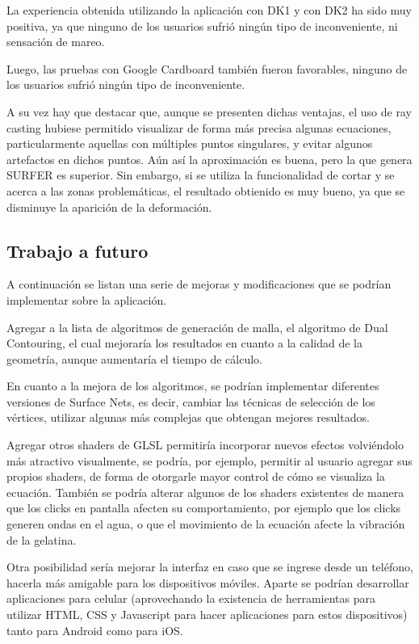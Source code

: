 \documentclass[12pt]{article}
\begin{document}
La experiencia obtenida utilizando la aplicación con DK1 y con DK2 ha sido muy positiva, ya que ninguno de los usuarios sufrió ningún tipo de inconveniente, ni sensación de mareo. 

Luego, las pruebas con Google Cardboard también fueron favorables, ninguno de los usuarios sufrió ningún tipo de inconveniente.

A su vez hay que destacar que, aunque se presenten dichas ventajas, el uso de ray casting hubiese permitido visualizar de forma más precisa algunas ecuaciones, particularmente aquellas con múltiples puntos singulares, y evitar algunos artefactos en dichos puntos. Aún así la aproximación es buena, pero la que genera SURFER es superior. Sin embargo, si se utiliza la funcionalidad de cortar y se acerca a las zonas problemáticas, el resultado obtienido es muy bueno, ya que se disminuye la aparición de la deformación.


\subsection{Trabajo a futuro}
A continuación se listan una serie de mejoras y modificaciones que se podrían implementar sobre la aplicación.

Agregar a la lista de algoritmos de generación de malla, el algoritmo de Dual Contouring\cite{dualcontour}, el cual mejoraría los resultados en cuanto a la calidad de la geometría, aunque aumentaría el tiempo de cálculo. 

En cuanto a la mejora de los algoritmos, se podrían implementar diferentes versiones de Surface Nets, es decir, cambiar las técnicas de selección de los vértices, utilizar algunas más complejas que obtengan mejores resultados.

Agregar otros shaders de GLSL permitiría incorporar nuevos efectos volviéndolo más atractivo visualmente, se podría, por ejemplo, permitir al usuario agregar sus propios shaders, de forma de otorgarle  mayor control de cómo se visualiza la ecuación. También se podría alterar algunos de los shaders existentes de manera que los clicks en pantalla afecten su comportamiento, por ejemplo que los clicks generen ondas en el agua, o que el movimiento de la ecuación afecte la vibración de la gelatina.

Otra posibilidad sería mejorar la interfaz en caso que se ingrese desde un teléfono, hacerla más amigable para los dispositivos móviles. Aparte se podrían desarrollar aplicaciones para celular (aprovechando la existencia de herramientas para utilizar HTML, CSS y Javascript para hacer aplicaciones para estos dispositivos) tanto para Android como para iOS. 
\end{document}
